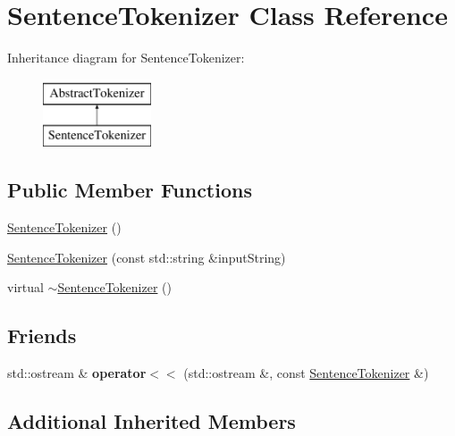 \hypertarget{classSentenceTokenizer}{\section{Sentence\-Tokenizer Class Reference}
\label{classSentenceTokenizer}
}
Inheritance diagram for Sentence\-Tokenizer\-:\begin{figure}[H]
\begin{center}
\leavevmode
\includegraphics[height=2.000000cm]{classSentenceTokenizer}
\end{center}
\end{figure}
\subsection*{Public Member Functions}
\begin{DoxyCompactItemize}
\item 
\hyperlink{classSentenceTokenizer_a7ac4c0f31e4066808cb2f4e8f1aee545}{Sentence\-Tokenizer} ()
\item 
\hyperlink{classSentenceTokenizer_a3ac263cb539f5dd072931a4d9f134d74}{Sentence\-Tokenizer} (const std\-::string \&input\-String)
\item 
virtual \hyperlink{classSentenceTokenizer_a91bcdff9ff84fce9c56208c19254bdba}{$\sim$\-Sentence\-Tokenizer} ()
\end{DoxyCompactItemize}
\subsection*{Friends}
\begin{DoxyCompactItemize}
\item 
\hypertarget{classSentenceTokenizer_a2998282df2f8bc7eb4c49617879f9256}{std\-::ostream \& {\bfseries operator$<$$<$} (std\-::ostream \&, const \hyperlink{classSentenceTokenizer}{Sentence\-Tokenizer} \&)}\label{classSentenceTokenizer_a2998282df2f8bc7eb4c49617879f9256}

\end{DoxyCompactItemize}
\subsection*{Additional Inherited Members}


